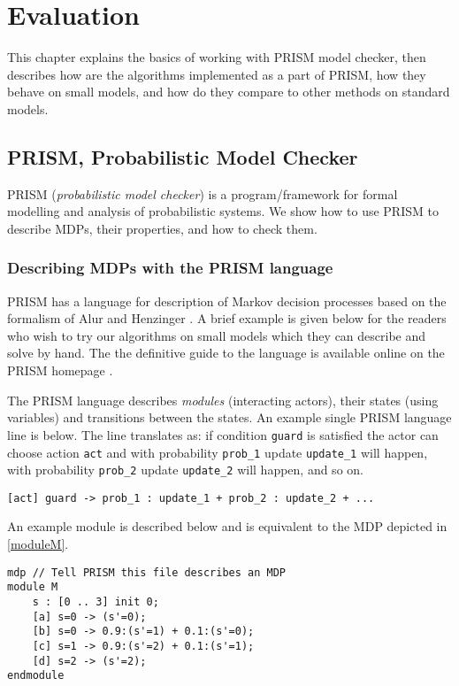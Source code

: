 \chapter{Evaluation}
\label{ch_evaluation}

This chapter explains the basics of working with PRISM model checker,
then describes how are the algorithms implemented as a part of PRISM,
how they behave on small models, and how do they compare to other
methods on standard models.

\section{PRISM, Probabilistic Model Checker}

PRISM \parencite{prism}
({\em probabilistic model checker}) is a program/framework
for formal modelling and analysis of probabilistic systems.
We show how to use PRISM to describe MDPs, their properties,
and how to check them.

\subsection*{Describing MDPs with the PRISM language}
PRISM has a language for description of Markov decision processes
based on the formalism of Alur and Henzinger \parencite{ReactiveModules}.
A brief example is given below for the readers who wish to try our
algorithms on small models which they can describe and solve by hand.
The the definitive guide to the language is available online on the
PRISM homepage \parencite{prism_lang}.

The PRISM language describes {\em modules} (interacting actors),
their states (using variables) and transitions between the states.
An example single PRISM language line is below. The line translates as:
if condition \verb|guard| is satisfied the actor can choose action \verb|act|
and
with probability \verb|prob_1| update \verb|update_1| will happen,
with probability \verb|prob_2| update \verb|update_2| will happen,
and so on.

\begin{verbatim}
[act] guard -> prob_1 : update_1 + prob_2 : update_2 + ...
\end{verbatim}

An example module is described below and is equivalent to the MDP
depicted in \autoref{moduleM}.

\smallskip
\begin{verbatim}
mdp // Tell PRISM this file describes an MDP
module M
    s : [0 .. 3] init 0;
    [a] s=0 -> (s'=0);
    [b] s=0 -> 0.9:(s'=1) + 0.1:(s'=0);
    [c] s=1 -> 0.9:(s'=2) + 0.1:(s'=1);
    [d] s=2 -> (s'=2);
endmodule
\end{verbatim}
\smallskip

